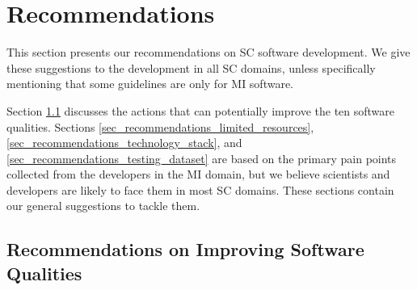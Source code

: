 \chapter{Recommendations}
\label{ch_recommendations}

This section presents our recommendations on SC software development. We give these suggestions to the development in all SC domains, unless specifically mentioning that some guidelines are only for MI software.

Section \ref{sec_recommendations_qualities} discusses the actions that can potentially improve the ten software qualities. Sections \ref{sec_recommendations_limited_resources}, \ref{sec_recommendations_technology_stack}, and \ref{sec_recommendations_testing_dataset} are based on the primary pain points collected from the developers in the MI domain, but we believe scientists and developers are likely to face them in most SC domains. These sections contain our general suggestions to tackle them. 

\section{Recommendations on Improving Software Qualities}
\label{sec_recommendations_qualities}

